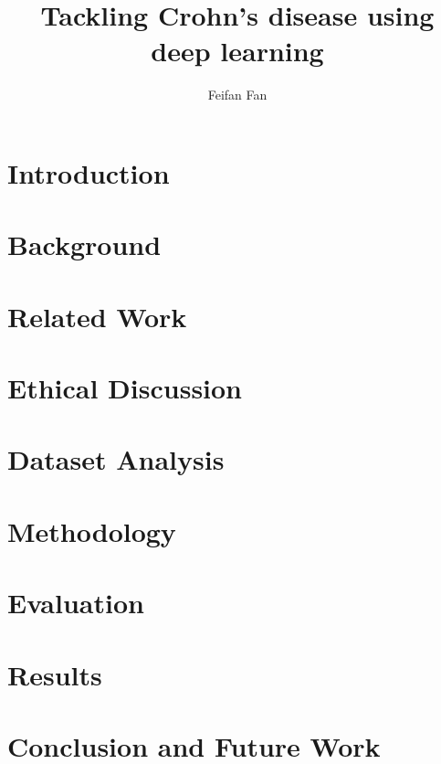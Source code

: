 \documentclass[a4paper,11pt]{report}
\begin{document}
\title{Tackling Crohn's disease using deep learning}
\author{Feifan Fan}





\tableofcontents
\listoffigures

\chapter{Introduction}


\chapter{Background}
\label{cha:background}


\chapter{Related Work}


\chapter{Ethical Discussion}


\chapter{Dataset Analysis}


\chapter{Methodology}
\label{cha:Methodology}


\chapter{Evaluation}
\label{cha:evaluation}


\chapter{Results}


\chapter{Conclusion and Future Work}
\label{cha:Conclusion}



\end{document}
